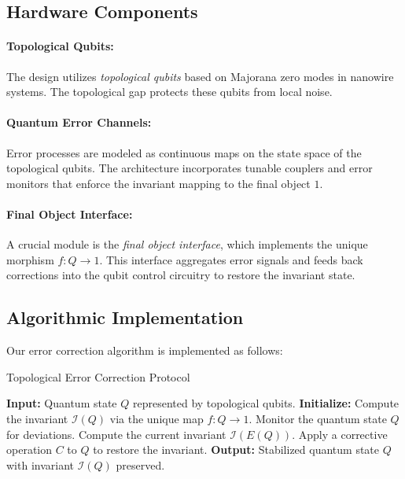 \documentclass[11pt]{article}
\begin{document}
\subsection{Hardware Components}
\paragraph{Topological Qubits:}  
The design utilizes \emph{topological qubits} based on Majorana zero modes in nanowire systems. The topological gap protects these qubits from local noise.

\paragraph{Quantum Error Channels:}  
Error processes are modeled as continuous maps on the state space of the topological qubits. The architecture incorporates tunable couplers and error monitors that enforce the invariant mapping to the final object \(1\).

\paragraph{Final Object Interface:}  
A crucial module is the \emph{final object interface}, which implements the unique morphism \(f: Q \to 1\). This interface aggregates error signals and feeds back corrections into the qubit control circuitry to restore the invariant state.

\subsection{Algorithmic Implementation}
Our error correction algorithm is implemented as follows:
\begin{algorithm}[H]
\caption{Topological Error Correction Protocol}\label{alg:tec}
\begin{algorithmic}[1]
\State \textbf{Input:} Quantum state \(Q\) represented by topological qubits.
\State \textbf{Initialize:} Compute the invariant \(\mathcal{I}(Q)\) via the unique map \(f: Q \to 1\).
\Repeat
    \State Monitor the quantum state \(Q\) for deviations.
    \State Compute the current invariant \(\mathcal{I}(E(Q))\).
        \State Apply a corrective operation \(C\) to \(Q\) to restore the invariant.
    \EndIf
{}
\State \textbf{Output:} Stabilized quantum state \(Q\) with invariant \(\mathcal{I}(Q)\) preserved.
\end{algorithmic}
\end{algorithm}
\end{document}
